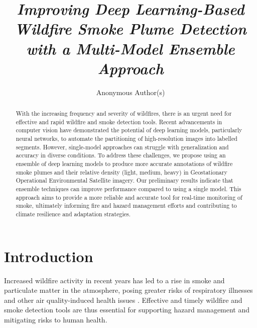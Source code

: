 \documentclass{article}
\title{\textit{Improving Deep Learning-Based Wildfire Smoke Plume Detection with a Multi-Model Ensemble Approach}}
\author{%
Anonymous Author(s)
}
\begin{document}
\maketitle

\begin{abstract}
With the increasing frequency and severity of wildfires, there is an urgent need for effective and rapid wildfire and smoke detection tools. Recent advancements in computer vision have demonstrated the potential of deep learning models, particularly neural networks, to automate the partitioning of high-resolution images into labelled segments. However, single-model approaches can struggle with generalization and accuracy in diverse conditions. To address these challenges, we propose using an ensemble of deep learning models to produce more accurate annotations of wildfire smoke plumes and their relative density (light, medium, heavy) in Geostationary Operational Environmental Satellite imagery. Our preliminary results indicate that ensemble techniques can improve performance compared to using a single model. This approach aims to provide a more reliable and accurate tool for real-time monitoring of smoke, ultimately informing fire and hazard management efforts and contributing to climate resilience and adaptation strategies.


\end{abstract}

\section{Introduction}
Increased wildfire activity in recent years has led to a rise in smoke and particulate matter in the atmosphere, posing greater risks of respiratory illnesses and other air quality-induced health issues \citep{wildfire-risk}. Effective and timely wildfire and smoke detection tools are thus essential for supporting hazard management and mitigating risks to human health. 
\end{document}
